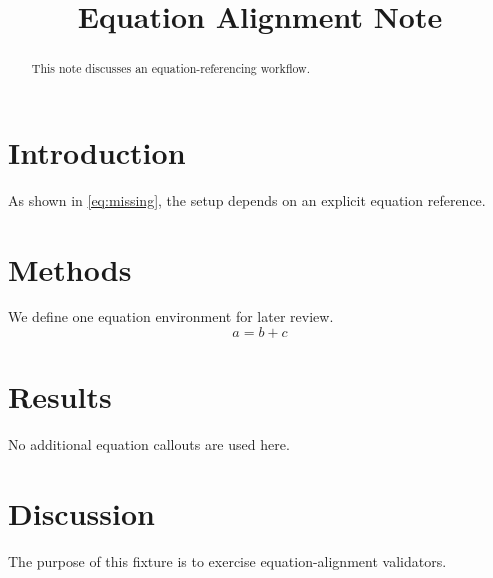 \title{Equation Alignment Note}

\begin{abstract}
This note discusses an equation-referencing workflow.
\end{abstract}

\section{Introduction}
As shown in \eqref{eq:missing}, the setup depends on an explicit equation reference.

\section{Methods}
We define one equation environment for later review.
\begin{equation}
\label{eq:unused}
a = b + c
\end{equation}

\section{Results}
No additional equation callouts are used here.

\section{Discussion}
The purpose of this fixture is to exercise equation-alignment validators.
